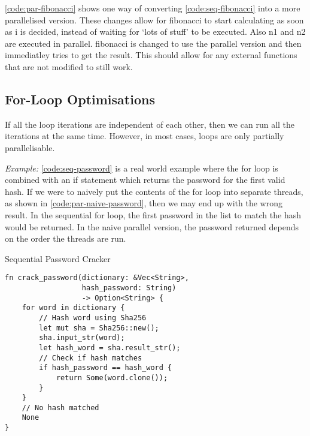 \documentclass[conference]{IEEEtran}
\begin{document}
\autoref{code:par-fibonacci} shows one way of converting \autoref{code:seq-fibonacci} into a more parallelised version. These changes allow for fibonacci to start calculating as soon as i is decided, instead of waiting for `lots of stuff' to be executed. Also n1 and n2 are executed in parallel. fibonacci is changed to use the parallel version and then immediatley tries to get the result. This should allow for any external functions that are not modified to still work.

\subsection{For-Loop Optimisations}
If all the loop iterations are independent of each other, then we can run all the iterations at the same time. However, in most cases, loops are only partially parallelisable.

\textit{Example:}
\autoref{code:seq-password} is a real world example where the for loop is combined with an if statement which returns the password for the first valid hash. If we were to naively put the contents of the for loop into separate threads, as shown in \autoref{code:par-naive-password}, then we may end up with the wrong result. In the sequential for loop, the first password in the list to match the hash would be returned. In the naive parallel version, the password returned depends on the order the threads are run.

\begin{algorithm}
\caption{Sequential Password Cracker}
\label{code:seq-password}
\begin{verbatim}
fn crack_password(dictionary: &Vec<String>,
                  hash_password: String)
                  -> Option<String> {
    for word in dictionary {
        // Hash word using Sha256
        let mut sha = Sha256::new();
        sha.input_str(word);
        let hash_word = sha.result_str();
        // Check if hash matches
        if hash_password == hash_word {
            return Some(word.clone());
        }
    }
    // No hash matched
    None
}
\end{verbatim}
\end{algorithm}
\end{document}
